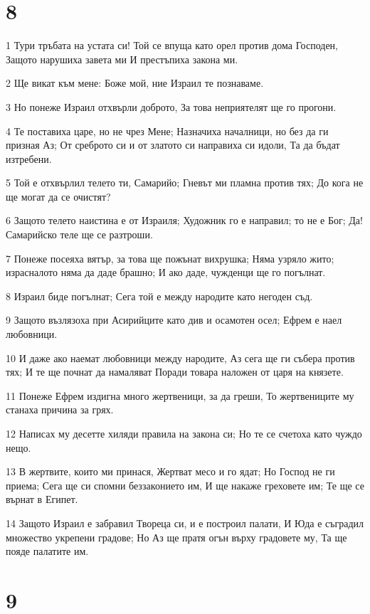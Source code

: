 \chapter{8}

\par 1 Тури тръбата на устата си! Той се впуща като орел против дома Господен, Защото нарушиха завета ми И престъпиха закона ми.
\par 2 Ще викат към мене: Боже мой, ние Израил те познаваме.
\par 3 Но понеже Израил отхвърли доброто, За това неприятелят ще го прогони.
\par 4 Те поставиха царе, но не чрез Мене; Назначиха началници, но без да ги призная Аз; От среброто си и от златото си направиха си идоли, Та да бъдат изтребени.
\par 5 Той е отхвърлил телето ти, Самарийо; Гневът ми пламна против тях; До кога не ще могат да се  очистят?
\par 6 Защото телето  наистина е от Израиля; Художник го е направил; то не е Бог; Да! Самарийско теле ще се разтроши.
\par 7 Понеже посеяха вятър, за това ще пожънат вихрушка; Няма узряло жито; израсналото няма да даде брашно; И ако даде, чужденци ще го погълнат.
\par 8 Израил биде погълнат; Сега той е между народите като негоден съд.
\par 9 Защото възлязоха при Асирийците като див и осамотен осел; Ефрем е наел любовници.
\par 10 И даже ако наемат любовници между народите, Аз сега ще ги събера против тях; И те ще почнат да намаляват Поради товара наложен от царя на князете.
\par 11 Понеже Ефрем издигна много жертвеници, за да греши, То жертвениците му станаха причина за грях.
\par 12 Написах му десетте хиляди правила на закона си; Но те се счетоха като чуждо нещо.
\par 13 В жертвите, които ми принася, Жертват месо и го ядат; Но Господ не ги приема; Сега ще си спомни беззаконието им, И ще накаже греховете им; Те ще се върнат в Египет.
\par 14 Защото Израил е забравил Твореца си, и е построил палати, И Юда е съградил множество укрепени градове; Но Аз ще пратя огън върху градовете му, Та ще пояде палатите им.

\chapter{9}

